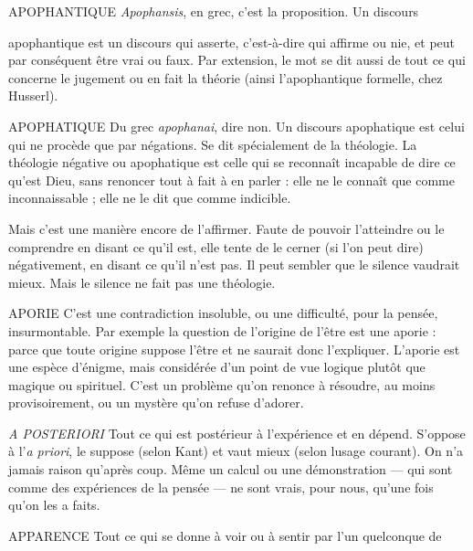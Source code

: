 APOPHANTIQUE {\it Apophansis}, en grec, c’est la proposition. Un discours

apophantique est un discours qui asserte, c’est-à-dire qui
affirme ou nie, et peut par conséquent être vrai ou faux. Par extension, le mot
se dit aussi de tout ce qui concerne le jugement ou en fait la théorie (ainsi l’apophantique
formelle, chez Husserl).

APOPHATIQUE Du grec {\it apophanai}, dire non. Un discours apophatique
est celui qui ne procède que par négations. Se dit spécialement
de la théologie. La théologie négative ou apophatique est celle qui se
reconnaît incapable de dire ce qu’est Dieu, sans renoncer tout à fait à en parler :
elle ne le connaît que comme inconnaissable ; elle ne le dit que comme indicible.

Mais c’est une manière encore de l’affirmer. Faute de pouvoir l’atteindre
ou le comprendre en disant ce qu’il est, elle tente de le cerner (si l’on peut dire)
négativement, en disant ce qu’il n’est pas. Il peut sembler que le silence vaudrait
mieux. Mais le silence ne fait pas une théologie.

APORIE C'est une contradiction insoluble, ou une difficulté, pour la pensée,
insurmontable. Par exemple la question de l’origine de l’être
est une aporie : parce que toute origine suppose l'être et ne saurait donc
l'expliquer. L’aporie est une espèce d’énigme, mais considérée d’un point de
vue logique plutôt que magique ou spirituel. C’est un problème qu’on
renonce à résoudre, au moins provisoirement, ou un mystère qu’on refuse
d’adorer.

{\it A POSTERIORI} Tout ce qui est postérieur à l’expérience et en dépend.
S’oppose à l’{\it a priori}, le suppose (selon Kant) et vaut mieux
(selon lusage courant). On n’a jamais raison qu'après coup. Même un calcul
ou une démonstration — qui sont comme des expériences de la pensée — ne sont
vrais, pour nous, qu’une fois qu’on les a faits.

APPARENCE Tout ce qui se donne à voir ou à sentir par l’un quelconque de

